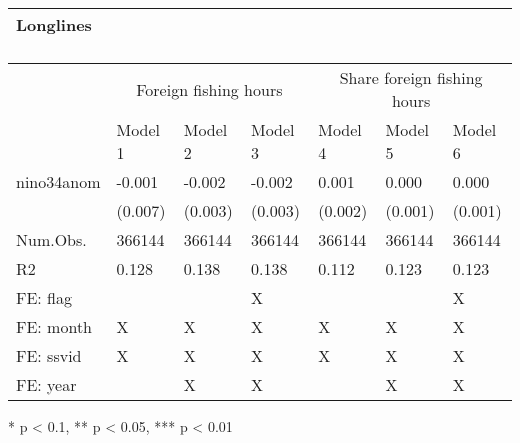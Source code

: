 \captionsetup[table]{labelformat=empty,skip=1pt}
\begin{longtable}{lllllll}
\caption*{
\large Longlines\\ 
\small \\ 
} \\ 
\toprule
& \multicolumn{3}{c}{Foreign fishing hours} & \multicolumn{3}{c}{Share foreign fishing hours} \\ 
 \cmidrule(lr){2-4}\cmidrule(lr){5-7}
  & Model 1 & Model 2 & Model 3 & Model 4 & Model 5 & Model 6 \\ 
\midrule
nino34anom & -0.001 & -0.002 & -0.002 & 0.001 & 0.000 & 0.000 \\ 
 & (0.007) & (0.003) & (0.003) & (0.002) & (0.001) & (0.001) \\ 
Num.Obs. & 366144 & 366144 & 366144 & 366144 & 366144 & 366144 \\ 
R2 & 0.128 & 0.138 & 0.138 & 0.112 & 0.123 & 0.123 \\ 
FE:  flag &  &  & X &  &  & X \\ 
FE:  month & X & X & X & X & X & X \\ 
FE:  ssvid & X & X & X & X & X & X \\ 
FE:  year &  & X & X &  & X & X \\ 
\bottomrule
\end{longtable}
\begin{minipage}{\linewidth}
* p < 0.1, ** p < 0.05, *** p < 0.01\\ 
\end{minipage}

